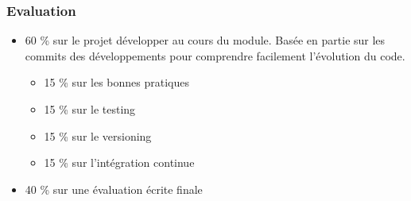 \documentclass{beamer}
\begin{document}
    \begin{frame}
        \transdissolve
        \frametitle{Evaluation}
        \begin{itemize}
            \item 60 \% sur le projet développer au cours du module.
            Basée en partie sur les commits des développements pour comprendre facilement l'évolution du code.
            \begin{itemize}
                \item 15 \% sur les bonnes pratiques
                \item 15 \% sur le testing
                \item 15 \% sur le versioning
                \item 15 \% sur l'intégration continue
            \end{itemize}
            \item 40 \% sur une évaluation écrite finale
        \end{itemize}
    \end{frame}
\end{document}
